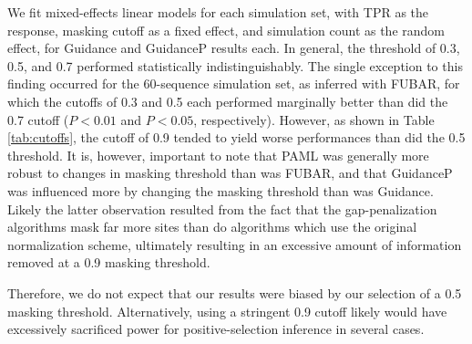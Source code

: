 \documentclass[11pt]{article}
\begin{document}
We fit mixed-effects linear models for each simulation set, with TPR as the response, masking cutoff as a fixed effect, and simulation count as the random effect, for Guidance and GuidanceP results each. In general, the threshold of 0.3, 0.5, and 0.7 performed statistically indistinguishably. The single exception to this finding occurred for the 60-sequence simulation set, as inferred with FUBAR, for which the cutoffs of 0.3 and 0.5 each performed marginally better than did the 0.7 cutoff ($P < 0.01$ and $P < 0.05$, respectively). However, as shown in Table \ref{tab:cutoffs}, the cutoff of 0.9 tended to yield worse performances than did the 0.5 threshold. It is, however, important to note that PAML was generally more robust to changes in masking threshold than was FUBAR, and that GuidanceP was influenced more by changing the masking threshold than was Guidance. Likely the latter observation resulted from the fact that the gap-penalization algorithms mask far more sites than do algorithms which use the original normalization scheme, ultimately resulting in an excessive amount of information removed at a 0.9 masking threshold.

Therefore, we do not expect that our results were biased by our selection of a 0.5 masking threshold. Alternatively, using a stringent 0.9 cutoff likely would have excessively sacrificed power for positive-selection inference in several cases. 
\end{document}
